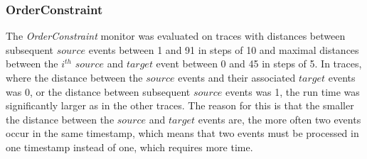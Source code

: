 \subsubsection{OrderConstraint}
The \textit{OrderConstraint} monitor was evaluated on traces with distances between subsequent $source$ events between 1 and 91 in steps of 10 and maximal distances between the $i^{th}$ $source$ and $target$ event between 0 and 45 in steps of 5. In traces, where the distance between the $source$ events and their associated $target$ events was 0, or the distance between subsequent $source$ events was 1, the run time was significantly larger as in the other traces. The reason for this is that the smaller the distance between the $source$ and $target$ events are, the more often two events occur in the same timestamp, which means that two events must be processed in one timestamp instead of one, which requires more time.
